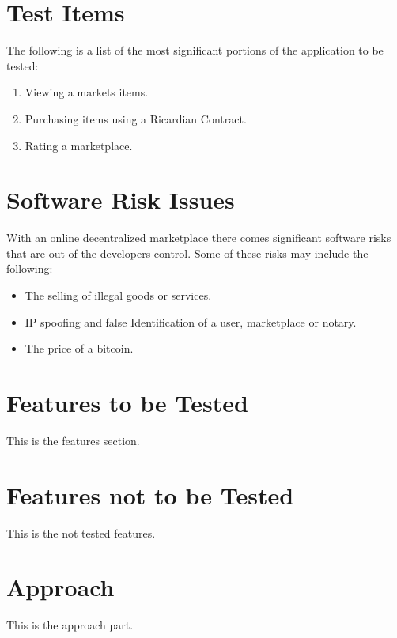 \documentclass{article}
\begin{document}
\section*{Test Items}
The following is a list of the most significant portions of the application to be tested:
\newline
\begin{enumerate}
 \item
Viewing a markets items.
 \item
Purchasing items using a Ricardian Contract.
 \item
Rating a marketplace.
\end{enumerate}

\section*{Software Risk Issues}
With an online decentralized marketplace there comes significant software risks that are out of the developers control.
Some of these risks may include the following:
\newline
\begin{itemize}
 \item
The selling of illegal goods or services.
 \item
IP spoofing and false Identification of a user, marketplace or notary.
 \item
The price of a bitcoin.
\end{itemize}

\section*{Features to be Tested}
This is the features section.

\section*{Features not to be Tested}
This is the not tested features.

\section*{Approach}
This is the approach part.

\end{document}
